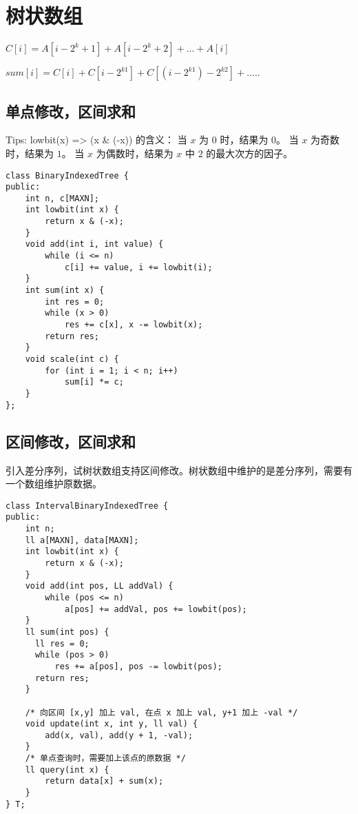 \section{树状数组}

\par \noindent $C[i] = A[i - 2^k+1] + A[i - 2^k+2] + ... + A[i]$
\par \noindent $sum[i] = C[i] + C[i-2^{k1}] + C[(i - 2^{k1}) - 2^{k2}] + .....$

\subsection{单点修改，区间求和}

\par Tips: lowbit(x) => (x \& (-x)) 的含义：
    当 $x$ 为 $0$ 时，结果为 $0$。
    当 $x$ 为奇数时，结果为 $1$。
    当 $x$ 为偶数时，结果为 $x$ 中 $2$ 的最大次方的因子。

\begin{verbatim}
class BinaryIndexedTree {
public:
    int n, c[MAXN];
    int lowbit(int x) {
        return x & (-x);
    }
    void add(int i, int value) {
        while (i <= n)
            c[i] += value, i += lowbit(i);
    }
    int sum(int x) {
        int res = 0;
        while (x > 0)
            res += c[x], x -= lowbit(x);
        return res;
    }
    void scale(int c) {
        for (int i = 1; i < n; i++)
            sum[i] *= c;
    }    
};
\end{verbatim}

\subsection{区间修改，区间求和}

\par \noindent 引入差分序列，试树状数组支持区间修改。树状数组中维护的是差分序列，需要有一个数组维护原数据。

\begin{verbatim}
class IntervalBinaryIndexedTree {
public:
    int n;
    ll a[MAXN], data[MAXN];
    int lowbit(int x) {
        return x & (-x);
    }
    void add(int pos, LL addVal) {
        while (pos <= n)
            a[pos] += addVal, pos += lowbit(pos);
    }
    ll sum(int pos) {
      ll res = 0;
      while (pos > 0)
          res += a[pos], pos -= lowbit(pos);
      return res;
    }

    /* 向区间 [x,y] 加上 val, 在点 x 加上 val, y+1 加上 -val */
    void update(int x, int y, ll val) {
        add(x, val), add(y + 1, -val);
    }
    /* 单点查询时，需要加上该点的原数据 */
    ll query(int x) {
        return data[x] + sum(x);
    }
} T;
\end{verbatim}

